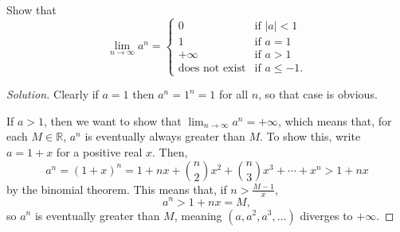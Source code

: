\documentclass[11pt]{scrartcl}
\providecommand{\RR}{\mathbb R}
\theoremstyle{remark}
\newenvironment{problem}[1]
{\renewcommand\theinnercustomthm{\textit{#1}}\innercustomthm}
{\endinnercustomthm}
\newenvironment{soln}{\begin{proof}[Solution]}{\end{proof}}
\begin{document}
	\begin{problem}{9.13}
		Show that
		\[\lim_{n\to\infty} a^n =\begin{cases}
			0 & \text{if }|a| < 1\\
			1 & \text{if }a = 1\\
			+\infty & \text{if }a > 1\\
			\text{does not exist} & \text{if }a\le -1.
		\end{cases}\]
	\end{problem}
	\begin{soln}
		Clearly if $a = 1$ then $a^n = 1^n = 1$ for all $n$,
		so that case is obvious.
		
		If $a > 1$, then we want to show that $\lim_{n\to\infty} a^n = +\infty$,
		which means that, for each $M\in\RR$, $a^n$ is eventually always greater
		than $M$. To show this, write $a = 1 + x$ for a positive real $x$. Then,
		\[a^n =
		(1 + x)^n = 1 + nx + \binom n2 x^2 + \binom n3 x^3 + \cdots + x^n > 1 + nx\]
		by the binomial theorem. This means that, if $n > \frac{M - 1}{x}$,
		\[a^n > 1 + nx = M,\]
		so $a^n$ is eventually greater than $M$, meaning $(a, a^2, a^3, \dots)$
		diverges to $+\infty$.
		

\end{soln}
\end{document}
